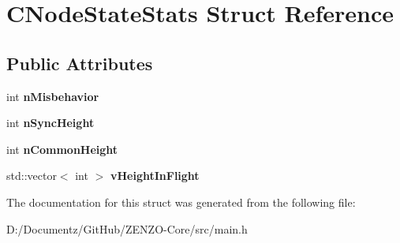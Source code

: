 \hypertarget{struct_c_node_state_stats}{}\section{C\+Node\+State\+Stats Struct Reference}
\label{struct_c_node_state_stats}
\subsection*{Public Attributes}
\begin{DoxyCompactItemize}
\item 
\mbox{\label{struct_c_node_state_stats_a62c2243d09166c1daaad84519700da3c}} 
int {\bfseries n\+Misbehavior}
\item 
\mbox{\label{struct_c_node_state_stats_a7646deac801098e973a5bc50202f92cd}} 
int {\bfseries n\+Sync\+Height}
\item 
\mbox{\label{struct_c_node_state_stats_a67c910a57285a63bbf0bb88ea7a9ca05}} 
int {\bfseries n\+Common\+Height}
\item 
\mbox{\label{struct_c_node_state_stats_a4b03fd8ecaa9268f7eca836e5e79c35a}} 
std\+::vector$<$ int $>$ {\bfseries v\+Height\+In\+Flight}
\end{DoxyCompactItemize}


The documentation for this struct was generated from the following file\+:\begin{DoxyCompactItemize}
\item 
D\+:/\+Documentz/\+Git\+Hub/\+Z\+E\+N\+Z\+O-\/\+Core/src/main.\+h\end{DoxyCompactItemize}
